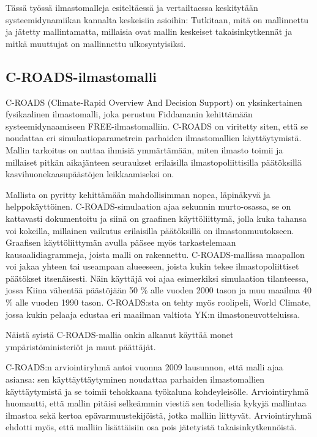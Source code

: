 \documentclass[finnish,12pt,a4paper,pdftex]{article}
\begin{document}
\begin{onehalfspacing}
Tässä työssä ilmastomalleja esiteltäessä ja vertailtaessa keskitytään systeemidynamiikan kannalta keskeisiin asioihin: Tutkitaan, mitä on mallinnettu ja jätetty mallintamatta, millaisia ovat mallin keskeiset takaisinkytkennät ja mitkä muuttujat on mallinnettu ulkosyntyisiksi. 

\subsection{C-ROADS-ilmastomalli \label{ilmasto:croads}}

C-ROADS (Climate-Rapid Overview And Decision Support) on yksinkertainen fysikaalinen ilmastomalli, joka perustuu Fiddamanin \cite{Fiddaman1997} kehittämään systeemidynaamiseen FREE-ilmastomalliin. C-ROADS on viritetty siten, että se noudattaa eri simulaatioparametrein parhaiden ilmastomallien käyttäytymistä. Mallin tarkoitus on auttaa ihmisiä ymmärtämään, miten ilmasto toimii ja millaiset pitkän aikajänteen seuraukset erilaisilla ilmastopoliittisilla päätöksillä kasvihuonekaasupäästöjen leikkaamiseksi on. \cite{Croads, CroadsWWW, CroadsFlightSimulator2011}

Mallista on pyritty kehittämään mahdollisimman nopea, läpinäkyvä ja helppokäyttöinen. C-ROADS-simulaation ajaa sekunnin murto-osassa, se on kattavasti dokumentoitu ja siinä on graafinen käyttöliittymä, jolla kuka tahansa voi kokeilla, millainen vaikutus erilaisilla päätöksillä on ilmastonmuutokseen. Graafisen käyttöliittymän avulla pääsee myös tarkastelemaan kausaalidiagrammeja, joista malli on rakennettu. C-ROADS-mallissa maapallon voi jakaa yhteen tai useampaan alueeseen, joista kukin tekee ilmastopoliittiset päätökset itsenäisesti. Näin käyttäjä voi ajaa esimerkiksi simulaation tilanteessa, jossa Kiina vähentää päästöjään 50 \% alle vuoden 2000 tason ja muu maailma 40 \% alle vuoden 1990 tason. C-ROADS:sta on tehty myös roolipeli, World Climate, jossa kukin pelaaja edustaa eri maailman valtiota YK:n ilmastoneuvotteluissa. \cite{Croads, CroadsWWW, CroadsFlightSimulator2011} 

Näistä syistä C-ROADS-mallia onkin alkanut käyttää monet ympäristöministeriöt ja muut päättäjät. 


C-ROADS:n arviointiryhmä antoi vuonna 2009 lausunnon, että malli ajaa asiansa: sen käyttäyttäytyminen noudattaa parhaiden ilmastomallien käyttäytymistä ja se toimii tehokkaana työkaluna kohdeyleisölle. Arviointiryhmä huomautti, että mallin pitäisi selkeämmin viestiä sen todellisia kykyjä mallintaa ilmastoa sekä kertoa epävarmuustekijöistä, jotka malliin liittyvät. Arviointiryhmä ehdotti myös, että malliin lisättäisiin osa pois jätetyistä takaisinkytkennöistä. \cite{Watson2009}


\end{onehalfspacing}
\end{document}
